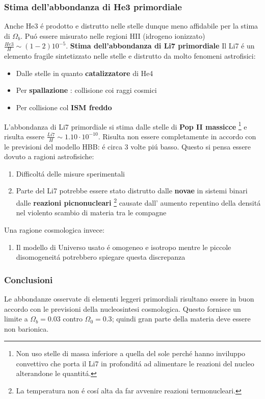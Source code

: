 \documentclass[12pt, a4paper]{article}
\begin{document}
\subsubsection{Stima dell'abbondanza di He3 primordiale}
Anche He3 \'{e} prodotto e distrutto nelle stelle dunque meno affidabile per la stima di $\Omega_b$. Pu\'{o} essere misurato nelle regioni HII (idrogeno ionizzato) $\frac{He3}{H}\sim (1-2)10^{-5}$.
\textbf{Stima dell'abbondanza di Li7 primordiale}
Il Li7 \'{e} un elemento fragile sintetizzato nelle stelle e distrutto da molto fenomeni astrofisici:
\begin{itemize}
\item Dalle stelle in quanto \textbf{catalizzatore} di He4
\item Per \textbf{spallazione} : collisione coi raggi cosmici
\item Per collisione col \textbf{ISM freddo}
\end{itemize}
L'abbondanza di Li7 primordiale si stima dalle stelle di \textbf{Pop II massicce} \footnote{Non uso stelle di massa inferiore a quella del sole perch\'{e} hanno inviluppo convettivo che porta il Li7 in profondit\'{a} ad alimentare le reazioni del nucleo alterandone le quantit\'{a}.} e risulta essere $\frac{Li7}{H}\sim 1.10 \cdot 10^{-10}$. Risulta non essere completamente in accordo con le previsioni del modello HBB: \'{e} circa 3 volte pi\'{u} basso. Questo si pensa essere dovuto a ragioni astrofisiche:
\begin{enumerate}
\item Difficolt\'{a} delle misure sperimentali
\item Parte del Li7 potrebbe essere stato distrutto dalle \textbf{novae} in sistemi binari dalle \textbf{reazioni picnonucleari} \footnote{La temperatura non \'{e} cos\'{i} alta da far avvenire reazioni termonucleari.} causate dall' aumento repentino della densit\'{a} nel violento scambio di materia tra le compagne
\end{enumerate}
Una ragione cosmologica invece:
\begin{enumerate}
\item Il modello di Universo usato \'{e} omogeneo e isotropo mentre le piccole disomogeneit\'{a} potrebbero spiegare questa discrepanza
\end{enumerate}
\subsubsection{Conclusioni}
Le abbondanze osservate di elementi leggeri primordiali risultano essere in buon accordo con le previsioni della nucleosintesi cosmologica. Questo fornisce un limite a $\Omega_b=0.03$ contro  $\Omega_0=0.3$; quindi gran parte della materia deve essere non barionica.
\end{document}
